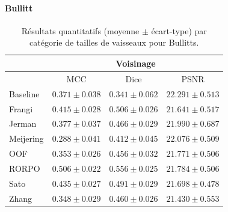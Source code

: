 \paragraph{Bullitt}

\begin{table}[H]
  \begin{center}
  \label{tab:Vessels size Bullitt}
  \caption{Résultats quantitatifs (moyenne $\pm$ écart-type) par catégorie de tailles de vaisseaux pour Bullitts.}
  
  \begin{tabular}{lccc}
            \hline
            & \multicolumn{3}{c}{Voisinage}                  \\
            \hline
            & MCC & Dice & PSNR  \\
            Baseline	    & $ 0.371 \pm 0.038 $ & $ 0.341 \pm 0.062 $ & $ 22.291 \pm	0.513 $ \\
            Frangi	    & $ 0.415 \pm 0.028 $ & $ 0.506 \pm 0.026 $ & $ 21.641 \pm	0.517 $ \\
            Jerman	    & $ 0.377 \pm 0.037 $ & $ 0.466 \pm 0.029 $ & $ 21.990 \pm	0.687 $ \\
            Meijering	    & $ 0.288 \pm 0.041 $ & $ 0.412 \pm 0.045 $ & $ 22.076 \pm	0.509 $ \\ 
            OOF	        & $ 0.353 \pm 0.026 $ & $ 0.456 \pm 0.032 $ & $ 21.771 \pm	0.506 $ \\
            RORPO	        & $ 0.506 \pm 0.022 $ & $ 0.556 \pm 0.025 $ & $ 21.784 \pm	0.506 $ \\
            Sato	        & $ 0.435 \pm 0.027 $ & $ 0.491 \pm 0.029 $ & $ 21.698 \pm	0.478 $ \\
            Zhang	        & $ 0.348 \pm 0.029 $ & $ 0.460 \pm 0.026 $ & $ 21.430 \pm	0.553 $ \\
      

\end{tabular}
\end{center}
\end{table}
